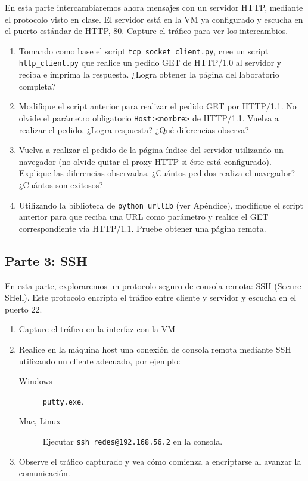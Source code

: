 \documentclass[a4paper,10pt]{article}
\begin{document}
En esta parte intercambiaremos ahora mensajes con un servidor HTTP, mediante el protocolo visto en clase. El servidor está en la VM ya configurado y escucha en el puerto estándar de HTTP, 80. Capture el tráfico para ver los intercambios.

\begin{enumerate}
    \item Tomando como base el script \texttt{tcp\_socket\_client.py}, cree un script \texttt{http\_client.py} que realice un pedido GET de HTTP/1.0 al servidor y reciba e imprima la respuesta. ¿Logra obtener la página del laboratorio completa?
    \item Modifique el script anterior para realizar el pedido GET por HTTP/1.1. No olvide el parámetro obligatorio \texttt{Host:<nombre>} de HTTP/1.1. Vuelva a realizar el pedido. ¿Logra respuesta? ¿Qué diferencias observa?
    \item Vuelva a realizar el pedido de la página índice del servidor utilizando un navegador (no olvide quitar el proxy HTTP si éste está configurado). Explique las diferencias observadas. ¿Cuántos pedidos realiza el navegador? ¿Cuántos son exitosos?
    \item Utilizando la biblioteca de \texttt{python urllib} (ver Apéndice), modifique el script anterior para que reciba una URL como parámetro y realice el GET correspondiente via HTTP/1.1. Pruebe obtener una página remota.
\end{enumerate}

\subsection*{Parte 3: SSH}

En esta parte, exploraremos un protocolo seguro de consola remota: SSH (Secure SHell). Este protocolo encripta el tráfico entre cliente y servidor y escucha en el puerto 22.

\begin{enumerate}
    \item Capture el tráfico en la interfaz con la VM
    \item Realice en la máquina host una conexión de consola remota mediante SSH utilizando un cliente adecuado, por ejemplo:
     \begin{description}
        \item[Windows] \texttt{putty.exe}.
        \item[Mac, Linux] Ejecutar \texttt{ssh redes@192.168.56.2} en la consola.
     \end{description}
    \item Observe el tráfico capturado y vea cómo comienza a encriptarse al avanzar la comunicación.
\end{enumerate}
\end{document}
